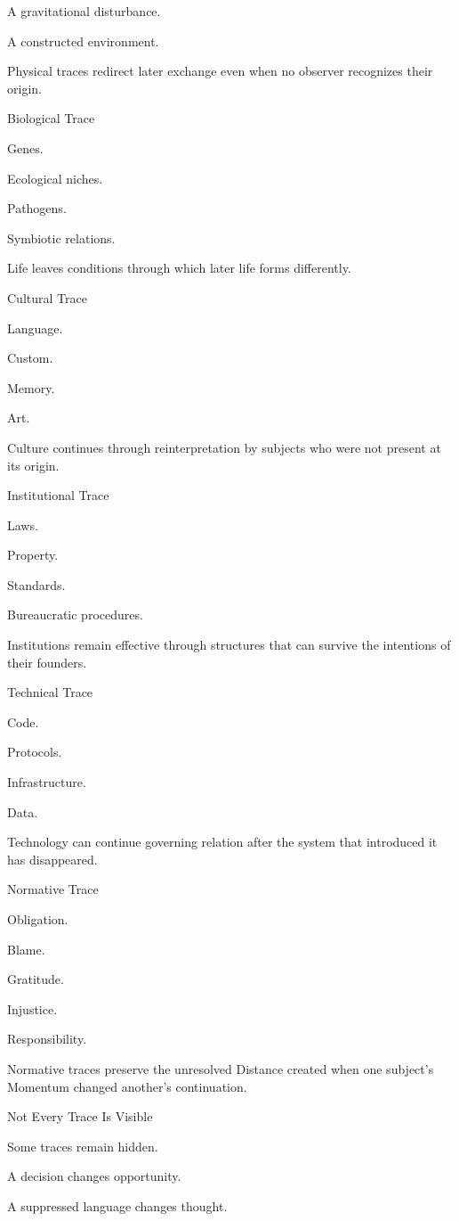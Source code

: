 A gravitational disturbance.

A constructed environment.

Physical traces redirect later exchange even when no observer recognizes their origin.

Biological Trace

Genes.

Ecological niches.

Pathogens.

Symbiotic relations.

Life leaves conditions through which later life forms differently.

Cultural Trace

Language.

Custom.

Memory.

Art.

Culture continues through reinterpretation by subjects who were not present at its origin.

Institutional Trace

Laws.

Property.

Standards.

Bureaucratic procedures.

Institutions remain effective through structures that can survive the intentions of their founders.

Technical Trace

Code.

Protocols.

Infrastructure.

Data.

Technology can continue governing relation after the system that introduced it has disappeared.

Normative Trace

Obligation.

Blame.

Gratitude.

Injustice.

Responsibility.

Normative traces preserve the unresolved Distance created when one subject’s Momentum changed another’s continuation.

Not Every Trace Is Visible

Some traces remain hidden.

A decision changes opportunity.

A suppressed language changes thought.

